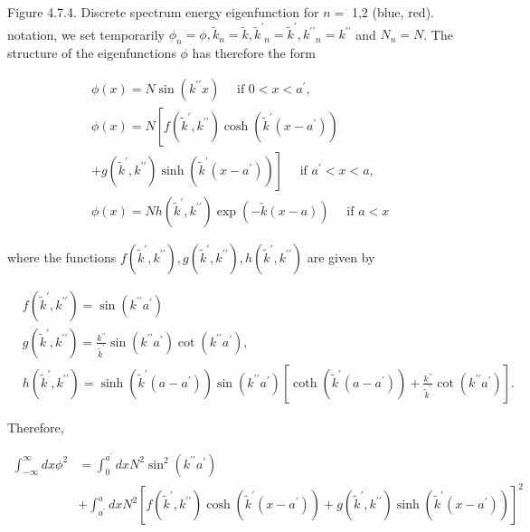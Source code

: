 \documentclass{article}
\begin{document}
Figure 4.7.4. Discrete spectrum energy eigenfunction for $n=$ 1,2 (blue, red).
notation, we set temporarily $\phi_{n}=\phi, \tilde{k}_{n}=\tilde{k}, \tilde{k}^{\prime}{ }_{n}=\tilde{k}^{\prime}, k^{\prime \prime}{ }_{n}=k^{\prime \prime}$ and $N_{n}=N$. The structure of the eigenfunctions $\phi$ has therefore the form
 
\begin{align*}
& \phi(x)=N \sin \left(k^{\prime \prime} x\right) \quad \text { if } 0<x<a^{\prime},  \tag{4.7.44a}\\
& \phi(x)=N\left[f\left(\tilde{k}^{\prime}, k^{\prime \prime}\right) \cosh \left(\tilde{k}^{\prime}\left(x-a^{\prime}\right)\right)\right.  \tag{4.7.44b}\\
& \left.+g\left(\tilde{k}^{\prime}, k^{\prime \prime}\right) \sinh \left(\tilde{k}^{\prime}\left(x-a^{\prime}\right)\right)\right] \quad \text { if } a^{\prime}<x<a, \\
& \phi(x)=N h\left(\tilde{k}^{\prime}, k^{\prime \prime}\right) \exp (-\tilde{k}(x-a)) \quad \text { if } a<x \tag{4.7.44c}
\end{align*}
 
where the functions $f\left(\tilde{k}^{\prime}, k^{\prime \prime}\right), g\left(\tilde{k}^{\prime}, k^{\prime \prime}\right), h\left(\tilde{k}^{\prime}, k^{\prime \prime}\right)$ are given by
 
\begin{align*}
& f\left(\tilde{k}^{\prime}, k^{\prime \prime}\right)=\sin \left(k^{\prime \prime} a^{\prime}\right)  \tag{4.7.45a}\\
& g\left(\tilde{k}^{\prime}, k^{\prime \prime}\right)=\frac{k^{\prime \prime}}{\tilde{k}^{\prime}} \sin \left(k^{\prime \prime} a^{\prime}\right) \cot \left(k^{\prime \prime} a^{\prime}\right),  \tag{4.7.45b}\\
& h\left(\tilde{k}^{\prime}, k^{\prime \prime}\right)=\sinh \left(\tilde{k}^{\prime}\left(a-a^{\prime}\right)\right) \sin \left(k^{\prime \prime} a^{\prime}\right)\left[\operatorname{coth}\left(\tilde{k}^{\prime}\left(a-a^{\prime}\right)\right)+\frac{k^{\prime \prime}}{\tilde{k}^{\prime}} \cot \left(k^{\prime \prime} a^{\prime}\right)\right] . \tag{4.7.45c}
\end{align*}
 

Therefore,
 
\begin{align*}
\int_{-\infty}^{\infty} d x \phi^{2} & =\int_{0}^{a^{\prime}} d x N^{2} \sin ^{2}\left(k^{\prime \prime} a^{\prime}\right)  \tag{4.7.46}\\
& +\int_{a^{\prime}}^{a} d x N^{2}\left[f\left(\tilde{k}^{\prime}, k^{\prime \prime}\right) \cosh \left(\tilde{k}^{\prime}\left(x-a^{\prime}\right)\right)+g\left(\tilde{k}^{\prime}, k^{\prime \prime}\right) \sinh \left(\tilde{k}^{\prime}\left(x-a^{\prime}\right)\right)\right]^{2}
\end{align*}
 
\end{document}
